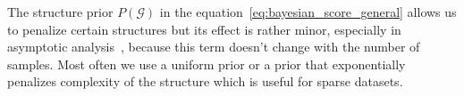 \documentclass[english,cover]{fitthesis} %
\newcommand{\term}[1]{\emph{#1}}           %
\newcommand{\vars}[1]{{\bold{#1}}}         %
\begin{document}

\medskip

The structure prior $P(\mathcal{G})$ in the equation~\eqref{eq:bayesian_score_general} allows us to penalize certain structures but its effect is rather minor, especially in asymptotic analysis~\cite[p.~804]{pgm}, because this term doesn't change with the number of samples. Most often we use a uniform prior or a prior that exponentially penalizes complexity of the structure which is useful for sparse datasets.
\end{document}
